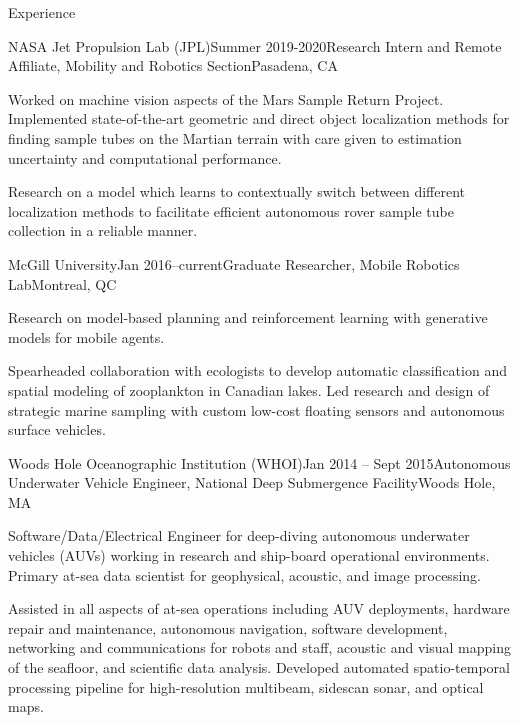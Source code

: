 \documentclass{resume} %
\begin{document}
\begin{rSection}{Experience}
\begin{rSubsection}{NASA Jet Propulsion Lab (JPL)}{Summer 2019-2020}{Research Intern and Remote Affiliate, Mobility and Robotics Section}{Pasadena, CA}
\item{Worked on machine vision aspects of the Mars Sample Return Project. Implemented state-of-the-art geometric and direct object localization methods for finding sample tubes on the Martian terrain with care given to estimation uncertainty and computational performance.}
\item{Research on a model which learns to contextually switch between different localization methods to facilitate efficient autonomous rover sample tube collection in a reliable manner.}
\end{rSubsection}
	\vspace{-.2cm}
\begin{rSubsection}{McGill University}{Jan 2016--current}{Graduate Researcher, Mobile Robotics Lab}{Montreal, QC}
\item{Research on model-based planning and reinforcement learning with generative models for mobile agents.}
\item{Spearheaded collaboration with ecologists to develop automatic classification and spatial modeling of zooplankton in Canadian lakes. Led research and design of strategic marine sampling with custom low-cost floating sensors and autonomous surface vehicles.}
\end{rSubsection}
	\vspace{-.2cm}
\begin{rSubsection}{Woods Hole Oceanographic Institution (WHOI)}{Jan 2014 -- Sept 2015}{Autonomous Underwater Vehicle Engineer, National Deep Submergence Facility}{Woods Hole, MA}
\item{Software/Data/Electrical Engineer for deep-diving autonomous underwater vehicles (AUVs) working in research and ship-board operational environments. Primary at-sea data scientist for geophysical, acoustic, and image processing.}
\item{Assisted in all aspects of at-sea operations including AUV deployments, hardware repair and maintenance, autonomous navigation, software development, networking and communications for robots and staff, acoustic and visual mapping of the seafloor, and scientific data analysis. Developed automated spatio-temporal processing pipeline for high-resolution multibeam, sidescan sonar, and optical maps.}

\end{rSubsection}
\end{rSection}
\end{document}

